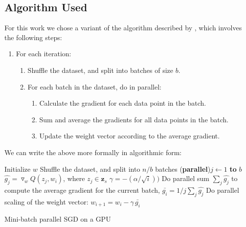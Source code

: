 \documentclass[11pt,a4paper]{article}
\begin{document}
\subsection{Algorithm Used}

For this work we chose a variant of the algorithm described by \cite{dekel2012optimal}, which involves the following steps:

\begin{enumerate}
	\item  	For each iteration:
	\begin{enumerate}
		\item Shuffle the dataset, and split into batches of size $b$.
		\item For each batch in the dataset, do in parallel:
		\begin{enumerate}
			\item Calculate the gradient for each data point in the batch.
			\item Sum and average the gradients for all data points in the batch.
			\item Update the weight vector according to the average gradient.
		\end{enumerate}
	\end{enumerate}
\end{enumerate}

We can write the above more formally in algorithmic form:

\begin{algorithm}
	\DontPrintSemicolon %
	Initialize $w$\;
	 {
		Shuffle the dataset, and split into $n/b$ batches\;
		 {
			\For(\textbf{parallel}){$j \gets 1$ \textbf{to} $b$} {
				$\hat{g_j} = \triangledown_w Q(z_j, w_i)$, where $z_j \in \mathbf{z}_s$\;
			}
			$\gamma = -(\alpha / \sqrt{i}))$\;
			Do parallel sum $\sum_j{\hat{g_j}}$ to compute the average gradient for the current batch, $\bar{g_i} = 1/j \sum_j{\hat{g_j}}$\;
			Do parallel scaling of the weight vector: $w_{i + 1} = w_i - \gamma \,  \bar{g_i}$\;
		}
	}
	\;
	\caption{Mini-batch parallel SGD on a GPU}
	\label{algo:sgd-gpu}
\end{algorithm}
\end{document}
